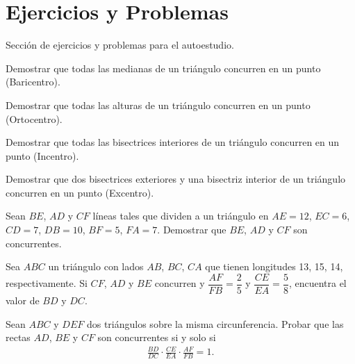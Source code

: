 \section{Ejercicios y Problemas}
{
    Sección de ejercicios y problemas para el autoestudio.

    \begin{section-exercise}
        Demostrar que todas las medianas de un triángulo concurren en un punto (Baricentro).
    \end{section-exercise}

    \begin{section-exercise}
        Demostrar que todas las alturas de un triángulo concurren en un punto (Ortocentro).
    \end{section-exercise}

    \begin{section-exercise}
        Demostrar que todas las bisectrices interiores de un triángulo concurren en un punto (Incentro).
    \end{section-exercise}

    \begin{section-exercise}
        Demostrar que dos bisectrices exteriores y una bisectriz interior de un triángulo concurren en un punto (Excentro).
    \end{section-exercise}

    \begin{section-exercise}
        Sean $BE$, $AD$ y $CF$ líneas tales que dividen a un triángulo en $AE = 12$, $EC = 6$, $CD = 7$, $DB = 10$, $BF = 5$, $FA = 7$.
        Demostrar que $BE$, $AD$ y $CF$ son concurrentes.
    \end{section-exercise}

    \begin{section-exercise}
        Sea $ABC$ un triángulo con lados $AB$, $BC$, $CA$ que tienen longitudes 13, 15, 14, respectivamente.
        Si $CF$, $AD$ y $BE$ concurren y $\dfrac{AF}{FB} = \dfrac{2}{5}$ y $\dfrac{CE}{EA} = \dfrac{5}{8}$, encuentra el valor de $BD$ y $DC$.
    \end{section-exercise}

    \begin{section-exercise}
        Sean $ABC$ y $DEF$ dos triángulos sobre la misma circunferencia.
        Probar que las rectas $AD$, $BE$ y $CF$ son concurrentes si y solo si
        \begin{gather*}
            \frac{BD}{DC} \cdot \frac{CE}{EA} \cdot \frac{AF}{FB} = 1.
        \end{gather*}
    \end{section-exercise}
}